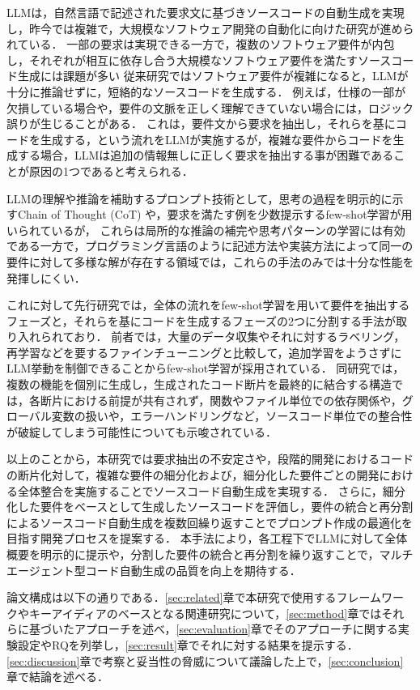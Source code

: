 \documentclass[submit,techrep,noauthor]{ipsj}
\begin{document}
LLMは，自然言語で記述された要求文に基づきソースコードの自動生成を実現し，昨今では複雑で，大規模なソフトウェア開発の自動化に向けた研究が進められている\cite{LLM_CodeGeneration}．
一部の要求は実現できる一方で，複数のソフトウェア要件が内包し，それぞれが相互に依存し合う大規模なソフトウェア要件を満たすソースコード生成には課題が多い
従来研究ではソフトウェア要件が複雑になると，LLMが十分に推論せずに，短絡的なソースコードを生成する．
例えば，仕様の一部が欠損している場合や，要件の文脈を正しく理解できていない場合には，ロジック誤りが生じることがある．
これは，要件文から要求を抽出し，それらを基にコードを生成する，という流れをLLMが実施するが，複雑な要件からコードを生成する場合，LLMは追加の情報無しに正しく要求を抽出する事が困難であることが原因の1つであると考えられる．

LLMの理解や推論を補助するプロンプト技術として，思考の過程を明示的に示すChain of Thought (CoT) や，要求を満たす例を少数提示するfew-shot学習が用いられているが，\cite{LLM_fewshot} これらは局所的な推論の補完や思考パターンの学習には有効である一方で，プログラミング言語のように記述方法や実装方法によって同一の要件に対して多様な解が存在する領域では，これらの手法のみでは十分な性能を発揮しにくい．

これに対して先行研究では，全体の流れをfew-shot学習を用いて要件を抽出するフェーズと，それらを基にコードを生成するフェーズの2つに分割する手法が取り入れられており\cite{tosem}．
前者では，大量のデータ収集やそれに対するラベリング，再学習などを要するファインチューニングと比較して，追加学習をようさずにLLM挙動を制御できることからfew-shot学習が採用されている．
同研究では，複数の機能を個別に生成し，生成されたコード断片を最終的に結合する構造では，各断片における前提が共有されず，関数やファイル単位での依存関係や，グローバル変数の扱いや，エラーハンドリングなど，ソースコード単位での整合性が破綻してしまう可能性についても示唆されている．


以上のことから，本研究では要求抽出の不安定さや，段階的開発におけるコードの断片化対して，複雑な要件の細分化および，細分化した要件ごとの開発における全体整合を実施することでソースコード自動生成を実現する．
さらに，細分化した要件をベースとして生成したソースコードを評価し，要件の統合と再分割によるソースコード自動生成を複数回繰り返すことでプロンプト作成の最適化を目指す開発プロセスを提案する．
本手法により，各工程下でLLMに対して全体概要を明示的に提示や，分割した要件の統合と再分割を繰り返すことで，マルチエージェント型コード自動生成の品質を向上を期待する．


論文構成は以下の通りである．\ref{sec:related}章で本研究で使用するフレームワークやキーアイディアのベースとなる関連研究について，\ref{sec:method}章ではそれらに基づいたアプローチを述べ，\ref{sec:evaluation}章でそのアプローチに関する実験設定やRQを列挙し，\ref{sec:result}章でそれに対する結果を提示する．\ref{sec:discussion}章で考察と妥当性の脅威について議論した上で，\ref{sec:conclusion}章で結論を述べる．
\end{document}
